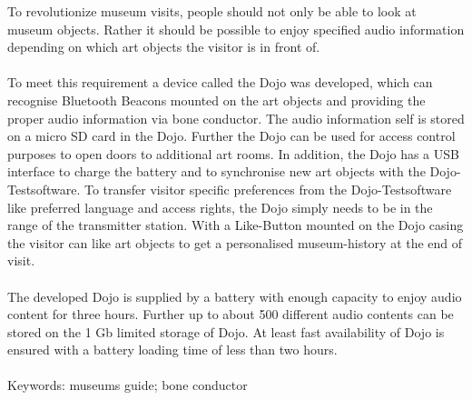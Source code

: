 To revolutionize museum visits, people should not only be able to look at museum objects. Rather it should be possible to enjoy specified audio information depending on which art objects the visitor is in front of.\\\\ To meet this requirement a device called the Dojo was developed, which can recognise Bluetooth Beacons mounted on the art objects and providing the proper audio information via bone conductor. The audio information self is stored on a micro SD card in the Dojo. Further the Dojo can be used for access control purposes to open doors to additional art rooms. In addition, the Dojo has a USB interface to charge the battery and to synchronise new art objects with the Dojo-Testsoftware. To transfer visitor specific preferences from the Dojo-Testsoftware like preferred language and access rights, the Dojo simply needs to be in the range of the transmitter station. With a Like-Button mounted on the Dojo casing the visitor can like art objects to get a personalised museum-history at the end of visit.\\\\ The developed Dojo is supplied by a battery with enough capacity to enjoy audio content for three hours. Further up to about 500 different audio contents can be stored on the 1 Gb limited storage of Dojo. At least fast availability of Dojo is ensured with a battery loading time of less than two hours.\\\\ Keywords: museums guide; bone conductor

